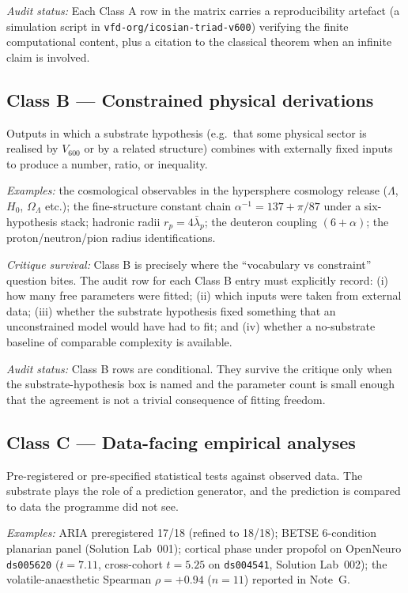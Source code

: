 \documentclass[11pt,a4paper]{article}
\newcommand{\Vsix}{V_{600}}
\begin{document}
\emph{Audit status:} Each Class A row in the matrix carries a
reproducibility artefact (a simulation script in
\texttt{vfd-org/icosian-triad-v600}) verifying the finite
computational content, plus a citation to the classical theorem
when an infinite claim is involved.

\subsection{Class B --- Constrained physical derivations}

Outputs in which a substrate hypothesis (e.g.\ that some physical
sector is realised by $\Vsix$ or by a related structure) combines
with externally fixed inputs to produce a number, ratio, or
inequality.

\emph{Examples:} the cosmological observables in the hypersphere
cosmology release ($\Lambda$, $H_0$, $\Omega_\Lambda$ etc.); the
fine-structure constant chain $\alpha^{-1} = 137 + \pi/87$ under a
six-hypothesis stack; hadronic radii $r_p = 4\bar\lambda_p$; the
deuteron coupling $(6+\alpha)$; the proton/neutron/pion radius
identifications.

\emph{Critique survival:} Class B is precisely where the
``vocabulary vs constraint'' question bites. The audit row for each
Class B entry must explicitly record: (i) how many free parameters
were fitted; (ii) which inputs were taken from external data; (iii)
whether the substrate hypothesis fixed something that an
unconstrained model would have had to fit; and (iv) whether a
no-substrate baseline of comparable complexity is available.

\emph{Audit status:} Class B rows are conditional. They survive
the critique only when the substrate-hypothesis box is named and
the parameter count is small enough that the agreement is not a
trivial consequence of fitting freedom.

\subsection{Class C --- Data-facing empirical analyses}

Pre-registered or pre-specified statistical tests against observed
data. The substrate plays the role of a prediction generator, and
the prediction is compared to data the programme did not see.

\emph{Examples:} ARIA preregistered 17/18 (refined to 18/18); BETSE
6-condition planarian panel (Solution Lab~001); cortical phase
under propofol on OpenNeuro \texttt{ds005620} ($t = 7.11$,
cross-cohort $t = 5.25$ on \texttt{ds004541}, Solution Lab~002);
the volatile-anaesthetic Spearman $\rho = +0.94$ ($n=11$) reported
in Note~G.
\end{document}
